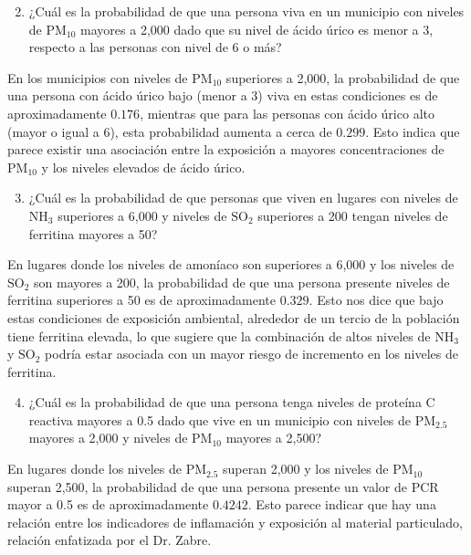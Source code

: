 \documentclass[12pt, letterpaper]{report}
\begin{document}
\begin{enumerate}
    \setcounter{enumi}{1}
    \item ¿Cuál es la probabilidad de que una persona viva en un municipio con niveles de \( \text{PM}_{10} \) mayores a 2,000 dado que su nivel de ácido úrico es menor a 3, respecto a las personas con nivel de 6 o más?
\end{enumerate}

En los municipios con niveles de \( \text{PM}_{10} \) superiores a 2,000, la probabilidad de que una persona con ácido úrico bajo (menor a 3) viva en estas condiciones es de aproximadamente \(0.176\), mientras que para las personas con ácido úrico alto (mayor o igual a 6), esta probabilidad aumenta a cerca de \(0.299\). Esto indica que parece existir una asociación entre la exposición a mayores concentraciones de \( \text{PM}_{10} \) y los niveles elevados de ácido úrico.

\begin{enumerate}
    \setcounter{enumi}{2}    
    \item ¿Cuál es la probabilidad de que personas que viven en lugares con niveles de \( \text{NH}_3 \) superiores a 6,000 y niveles de \( \text{SO}_2 \) superiores a 200 tengan niveles de ferritina mayores a 50?
\end{enumerate}

 En lugares donde los niveles de amoníaco son superiores a 6,000 y los niveles de \( \text{SO}_2 \) son mayores a 200, la probabilidad de que una persona presente niveles de ferritina superiores a 50 es de aproximadamente \(0.329\). Esto nos dice que bajo estas condiciones de exposición ambiental, alrededor de un tercio de la población tiene ferritina elevada, lo que sugiere que la combinación de altos niveles de \( \text{NH}_3 \) y \( \text{SO}_2 \) podría estar asociada con un mayor riesgo de incremento en los niveles de ferritina.

\begin{enumerate}
    \setcounter{enumi}{3}    
    \item ¿Cuál es la probabilidad de que una persona tenga niveles de proteína C reactiva mayores a 0.5 dado que vive en un municipio con niveles de \( \text{PM}_{2.5} \) mayores a 2,000 y niveles de \( \text{PM}_{10} \) mayores a 2,500?
\end{enumerate}

En lugares donde los niveles de \( \text{PM}_{2.5} \) superan 2,000 y los niveles de \( \text{PM}_{10} \) superan 2,500, la probabilidad de que una persona presente un valor de PCR mayor a 0.5 es de aproximadamente \(0.4242\). Esto parece indicar que hay una relación entre los indicadores de inflamación y exposición al material particulado, relación enfatizada por el Dr. Zabre.
\end{document}
